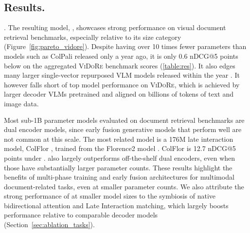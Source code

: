
\subsection{Results.}
\label{sec:results}



\noindent\textbf{\colflagship{}}. The resulting model, \colflagship{}, showcases strong performance on visual document retrieval benchmarks, especially relative to its size category (Figure~\ref{fig:pareto_vidore}). Despite having over 10 times fewer parameters than models such as ColPali released only a year ago, it is only 0.6 nDCG@5 points below on the aggregated \textsc{ViDoRe} benchmark scores (\autoref{table:res}). It also edges many larger single-vector repurposed VLM models released within the year . It however falls short of top model performance on \textsc{ViDoRe}, which is achieved by larger decoder VLMs pretrained and aligned on billions of tokens of text and image data.

Most sub-1B parameter models evaluated on document retrieval benchmarks are dual encoder models, since early fusion generative models that perform well are not common at this scale. The most related model is a 176M late interaction model, ColFlor , trained from the Florence2 model . ColFlor is 12.7 nDCG@5 points under \colflagship{}. \colflagship{} also largely outperforms off-the-shelf dual encoders, even when those have substantially larger parameter counts. 
These results highlight the benefits of multi-phase training and early fusion architectures for multimodal document-related tasks, even at smaller parameter counts. We also attribute the strong performance of \colflagship{} at smaller model sizes to the symbiosis of native bidirectional attention and Late Interaction matching, which largely boosts performance relative to comparable decoder models (Section~\ref{sec:ablation_tasks}).


